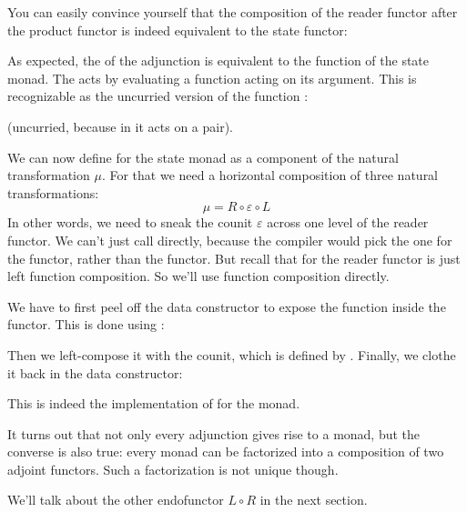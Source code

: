 You can easily convince yourself that the composition of the reader
functor after the product functor is indeed equivalent to the state
functor:

As expected, the  of the adjunction is equivalent to the
 function of the state monad. The  acts by
evaluating a function acting on its argument. This is recognizable as
the uncurried version of the function :

(uncurried, because in  it acts on a pair).

We can now define  for the state monad as a component of
the natural transformation $\mu$. For that we need a horizontal composition
of three natural transformations:
\[\mu = R \circ \varepsilon \circ L\]
In other words, we need to sneak the counit $\varepsilon$ across one level of the
reader functor. We can't just call  directly, because the
compiler would pick the one for the  functor, rather than
the  functor. But recall that  for the
reader functor is just left function composition. So we'll use function
composition directly.

We have to first peel off the data constructor  to expose
the function inside the  functor. This is done using
:

Then we left-compose it with the counit, which is defined by
. Finally, we clothe it back in the
 data constructor:

This is indeed the implementation of  for the
 monad.

It turns out that not only every adjunction gives rise to a monad, but
the converse is also true: every monad can be factorized into a
composition of two adjoint functors. Such a factorization is not unique
though.

We'll talk about the other endofunctor $L \circ R$ in the next
section.
